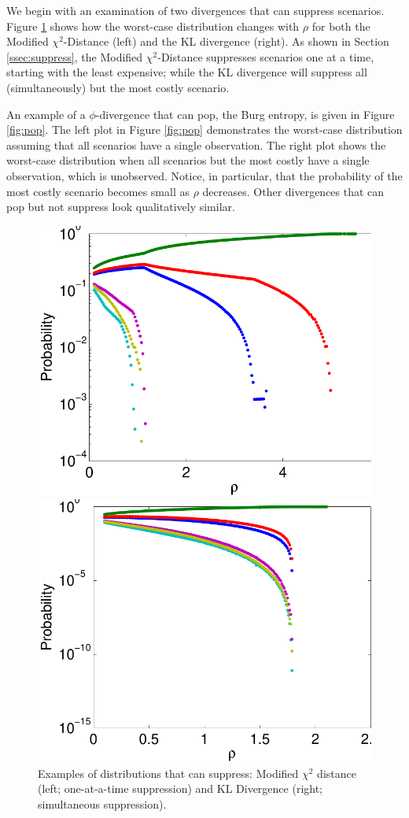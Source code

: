 \documentclass[opre,nonblindrev]{informs3} %
\begin{document}
We begin with an examination of two divergences that can suppress scenarios.
Figure \ref{fig:suppress} shows how the worst-case distribution changes with $\rho$ for both the Modified $\chi^2$-Distance (left) and the KL divergence (right).
As shown in Section \ref{ssec:suppress}, the Modified $\chi^2$-Distance suppresses scenarios one at a time, starting with the least expensive; while the KL divergence will suppress all (simultaneously) but the most costly scenario.

An example of a $\phi$-divergence that can pop, the Burg entropy, is given in Figure \ref{fig:pop}.
The left plot in Figure \ref{fig:pop} demonstrates the worst-case distribution assuming that all scenarios have a single observation.
The right plot shows the worst-case distribution when all scenarios but the most costly have a single observation, which is unobserved.
Notice, in particular, that the probability of the most costly scenario becomes small as $\rho$ decreases.
Other divergences that can pop but not suppress look qualitatively similar.

\begin{figure}
	\FIGURE
	{%
		\includegraphics*[width=.45\textwidth]{images/mchi2}%
		\includegraphics*[width=.45\textwidth]{images/kl}%
	}
	{
		Examples of distributions that can suppress: Modified $\chi^2$ distance (left; one-at-a-time suppression) and KL Divergence (right; simultaneous suppression).
		\label{fig:suppress}
	}
	{}
\end{figure}
\end{document}
